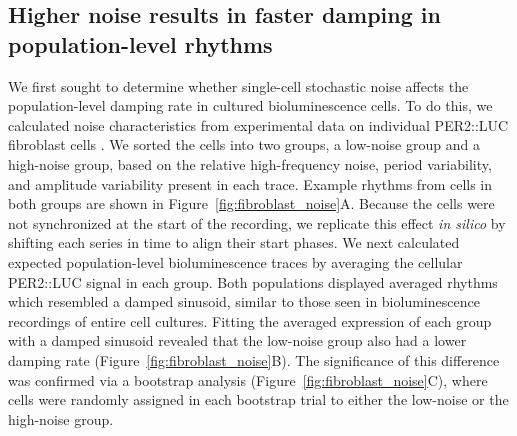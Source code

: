 \documentclass[11pt, letterpaper]{article}
\begin{document}
\subsection*{Higher noise results in faster damping in population-level rhythms}

We first sought to determine whether single-cell stochastic noise affects the population-level damping rate in cultured bioluminescence cells.
To do this, we calculated noise characteristics from experimental data on individual PER2::LUC fibroblast cells \cite{Leise2012}.
We sorted the cells into two groups, a low-noise group and a high-noise group, based on the relative high-frequency noise, period variability, and amplitude variability present in each trace.
Example rhythms from cells in both groups are shown in Figure~\ref{fig:fibroblast_noise}A.
Because the cells were not synchronized at the start of the recording, we replicate this effect {\itshape in silico} by shifting each series in time to align their start phases.
We next calculated expected population-level bioluminescence traces by averaging the cellular PER2::LUC signal in each group.
Both populations displayed averaged rhythms which resembled a damped sinusoid, similar to those seen in bioluminescence recordings of entire cell cultures.
Fitting the averaged expression of each group with a damped sinusoid revealed that the low-noise group also had a lower damping rate (Figure~\ref{fig:fibroblast_noise}B).
The significance of this difference was confirmed via a bootstrap analysis (Figure~\ref{fig:fibroblast_noise}C), where cells were randomly assigned in each bootstrap trial to either the low-noise or the high-noise group.
\end{document}

